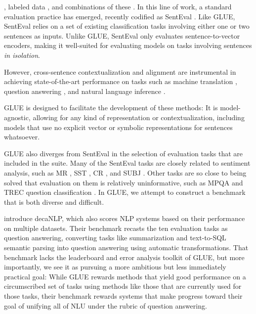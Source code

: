 \citep{hill2016learning,peters2018deep}, labeled data \citep{conneau2018senteval,mccann2017learned}, and combinations of these \citep{collobert2011natural,subramanian2018large}. In this line of work, a standard evaluation practice has emerged, recently codified as SentEval \citep{DBLP:conf/emnlp/ConneauKSBB17,conneau2018senteval}. Like GLUE, SentEval relies on a set of existing classification tasks involving either one or two sentences as inputs. Unlike GLUE, SentEval only evaluates sentence-to-vector encoders, making it well-suited for evaluating models on tasks involving sentences \emph{in isolation}.

However, cross-sentence contextualization and alignment are instrumental in achieving state-of-the-art performance on tasks such as machine translation \citep{bahdanau2014neural,vaswani2017attention}, question answering \citep{seo2016bidirectional}, and natural language inference \citep{rocktaschel2015reasoning}.

GLUE is designed to facilitate the development of these methods: It is model-agnostic, allowing for any kind of representation or contextualization, including models that use no explicit vector or symbolic representations for sentences whatsoever.

GLUE also diverges from SentEval in the selection of evaluation tasks that are included in the suite. Many of the SentEval tasks are closely related to sentiment analysis, such as MR \citep{pang2005seeing}, SST \citep{socher2013recursive}, CR \citep{hu2004mining}, and SUBJ \citep{pang2004sentimental}. Other tasks are so close to being solved that evaluation on them is relatively  uninformative, such as MPQA \citep{wiebe2005annotating} and TREC question classification \citep{voorhees1999trec}. In GLUE, we attempt to construct a benchmark that is both diverse and difficult.

\citet{McCann2018decaNLP} introduce decaNLP, which also scores NLP systems based on their performance on multiple datasets. Their benchmark recasts the ten evaluation tasks as question answering, converting tasks like summarization and text-to-SQL semantic parsing into question answering using automatic transformations. That benchmark lacks the leaderboard and error analysis toolkit of GLUE, but more importantly, we see it as pursuing a more ambitious but less immediately practical goal: While GLUE rewards methods that yield good performance on a circumscribed set of tasks using methods like those that are currently used for those tasks, their benchmark rewards systems that make progress toward their goal of unifying all of NLU under the rubric of question answering.

